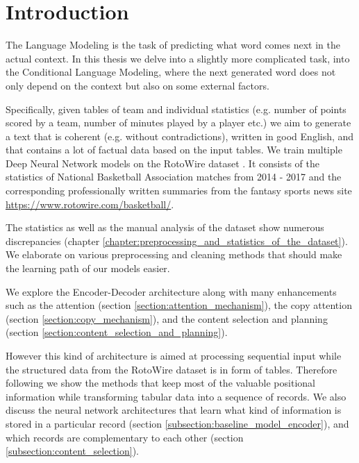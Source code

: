 \chapter*{Introduction} \label{IntroductionChapter}

The Language Modeling is the task of predicting what word comes next in the actual context. In this thesis we delve into a slightly more complicated task, into the Conditional Language Modeling, where the next generated word does not only depend on the context but also on some external factors.

Specifically, given tables of team and individual statistics (e.g. number of points scored by a team,  number of minutes played by a player etc.) we aim to generate a text that is coherent (e.g. without contradictions), written in good English, and that contains a lot of factual data based on the input tables. We train multiple Deep Neural Network models on the RotoWire dataset \citep{wiseman2017}. It consists of the statistics of National Basketball Association matches from 2014 - 2017 and the corresponding professionally written summaries from the fantasy sports news site \url{https://www.rotowire.com/basketball/}.

The statistics as well as the manual analysis of the dataset show numerous discrepancies (chapter \ref{chapter:preprocessing_and_statistics_of_the_dataset}). We elaborate on various preprocessing and cleaning methods that should make the learning path of our models easier.

We explore the Encoder-Decoder architecture \citep{sutskever2014sequence} along with many enhancements such as the attention (section \ref{section:attention_mechanism}), the copy attention (section \ref{section:copy_mechanism}), and the content selection and planning (section \ref{section:content_selection_and_planning}).

However this kind of architecture is aimed at processing sequential input while the structured data from the RotoWire dataset is in form of tables. Therefore following \citet{wiseman2017} we show the methods that keep most of the valuable positional information while transforming tabular data into a sequence of records. We also discuss the neural network architectures that learn what kind of information is stored in a particular record (section \ref{subsection:baseline_model_encoder}), and which records are complementary to each other (section \ref{subsection:content_selection}).

